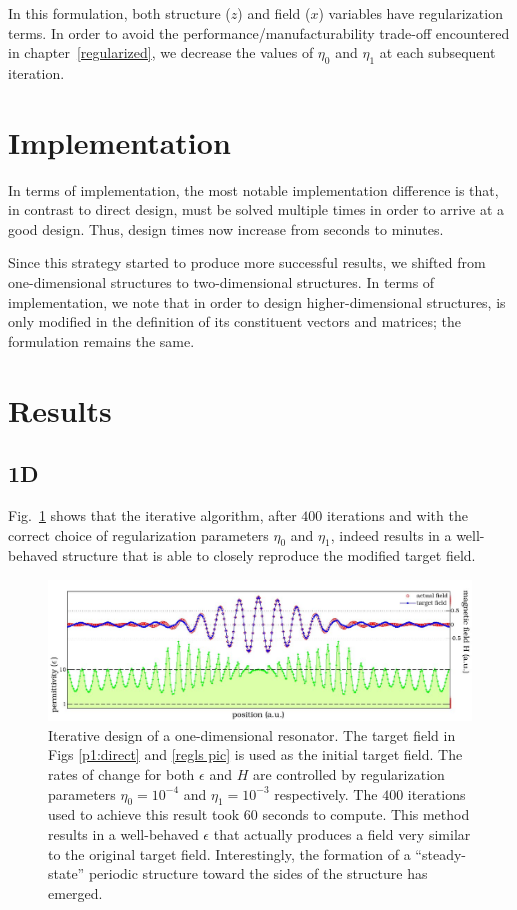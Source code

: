 In this formulation, both structure ($z$) and field ($x$) variables
    have regularization terms.
In order to avoid the performance/manufacturability trade-off 
    encountered in chapter~\ref{regularized},
    we decrease the values of $\eta_0$ and $\eta_1$ at each subsequent iteration.

\section{Implementation}
In terms of implementation,
    the most notable implementation difference is that,
    in contrast to direct design,
     must be solved multiple times
    in order to arrive at a good design.
Thus, design times now increase from seconds to minutes.

Since this strategy started to produce more successful results,
    we shifted from one-dimensional structures to two-dimensional structures.
In terms of implementation, we note that 
    in order to design higher-dimensional structures,
     is only modified in the
    definition of its constituent vectors and matrices;
    the formulation remains the same.


\section{Results}
\subsection{1D}
Fig.~\ref{comp pic} shows that the iterative algorithm, after $400$ iterations and with the correct choice of regularization parameters $\eta_0$ and $\eta_1$, 
    indeed results in a well-behaved structure that is able to closely reproduce the modified target field\cite{Lu10}.

\begin{figure}[htbp]\centering
\includegraphics[width=\textwidth]{p1/complementary}
\caption{Iterative design of a one-dimensional resonator. 
    The target field in Figs \ref{p1:direct} and \ref{regls pic} is used as the initial target field. The rates of change for both $\epsilon$ and $H$ are controlled by regularization parameters $\eta_0=10^{-4}$ and $\eta_1=10^{-3}$ respectively. The $400$ iterations used to achieve this result took $60$ seconds to compute. This method results in a well-behaved $\epsilon$ that actually produces a field very similar to the original target field. Interestingly, the formation of a ``steady-state'' periodic structure toward the sides of the structure has emerged.}
\label{comp pic}
\end{figure}

